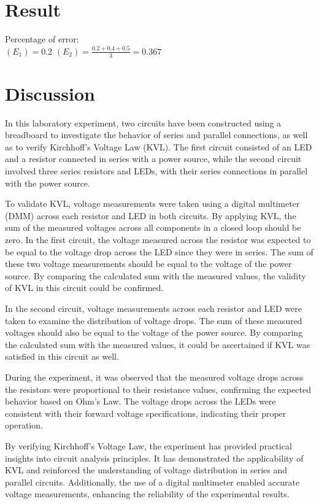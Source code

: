 \section{Result}
Percentage of error: \\
$(E_1) = 0.2$
$(E_2) = \frac{0.2+0.4+0.5}{3} = 0.367$

\section{Discussion}

In this laboratory experiment, two circuits have been constructed using a breadboard to investigate the behavior of series and parallel connections, as well as to verify Kirchhoff's Voltage Law (KVL). The first circuit consisted of an LED and a resistor connected in series with a power source, while the second circuit involved three series resistors and LEDs, with their series connections in parallel with the power source.

To validate KVL, voltage measurements were taken using a digital multimeter (DMM) across each resistor and LED in both circuits. By applying KVL, the sum of the measured voltages across all components in a closed loop should be zero. In the first circuit, the voltage measured across the resistor was expected to be equal to the voltage drop across the LED since they were in series. The sum of these two voltage measurements should be equal to the voltage of the power source. By comparing the calculated sum with the measured values, the validity of KVL in this circuit could be confirmed.

In the second circuit, voltage measurements across each resistor and LED were taken to examine the distribution of voltage drops. The sum of these measured voltages should also be equal to the voltage of the power source. By comparing the calculated sum with the measured values, it could be ascertained if KVL was satisfied in this circuit as well.

During the experiment, it was observed that the measured voltage drops across the resistors were proportional to their resistance values, confirming the expected behavior based on Ohm's Law. The voltage drops across the LEDs were consistent with their forward voltage specifications, indicating their proper operation.

By verifying Kirchhoff's Voltage Law, the experiment has provided practical insights into circuit analysis principles. It has demonstrated the applicability of KVL and reinforced the understanding of voltage distribution in series and parallel circuits. Additionally, the use of a digital multimeter enabled accurate voltage measurements, enhancing the reliability of the experimental results.

